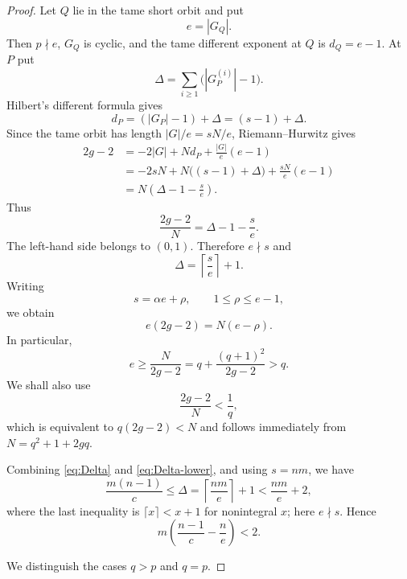 \documentclass[11pt]{amsart}
\theoremstyle{remark}
\begin{document}
\begin{proof}
Let $Q$ lie in the tame short orbit and put
\[
          e=|G_Q|.
\]
Then $p\nmid e$, $G_Q$ is cyclic, and the tame different exponent at
$Q$ is $d_Q=e-1$.  At $P$ put
\[
          \Delta=\sum_{i\ge1}\bigl(|G_P^{(i)}|-1\bigr).
\]
Hilbert's different formula gives
\[
          d_P=(|G_P|-1)+\Delta=(s-1)+\Delta.
\]
Since the tame orbit has length $|G|/e=sN/e$, Riemann--Hurwitz gives
\[
\begin{aligned}
 2g-2
   &=-2|G|+N d_P+\frac{|G|}{e}(e-1)\\
   &=-2sN+N\bigl((s-1)+\Delta\bigr)
      +\frac{sN}{e}(e-1)\\
   &=N\left(\Delta-1-\frac{s}{e}\right).
\end{aligned}
\]
Thus
\begin{equation}\label{eq:globalRH}
 \frac{2g-2}{N}
 =
 \Delta-1-\frac{s}{e}.
\end{equation}
The left-hand side belongs to $(0,1)$.  Therefore $e\nmid s$ and
\begin{equation}\label{eq:Delta}
          \Delta=\left\lceil\frac{s}{e}\right\rceil+1.
\end{equation}
Writing
\[
          s=\alpha e+\rho,
          \qquad 1\le\rho\le e-1,
\]
we obtain
\[
          e(2g-2)=N(e-\rho).
\]
In particular,
\begin{equation}\label{eq:e-lower}
          e\ge\frac{N}{2g-2}
          =q+\frac{(q+1)^2}{2g-2}>q.
\end{equation}
We shall also use
\begin{equation}\label{eq:ratio-less-1q}
          \frac{2g-2}{N}<\frac1q,
\end{equation}
which is equivalent to $q(2g-2)<N$ and follows immediately from
$N=q^2+1+2gq$.

Combining \eqref{eq:Delta} and \eqref{eq:Delta-lower}, and using
$s=nm$, we have
\[
 \frac{m(n-1)}{c}
 \le \Delta
 =\left\lceil\frac{nm}{e}\right\rceil+1
 <\frac{nm}{e}+2,
\]
where the last inequality is $\lceil x\rceil<x+1$ for nonintegral
$x$; here $e\nmid s$.  Hence
\begin{equation}\label{eq:master}
 m\left(\frac{n-1}{c}-\frac{n}{e}\right)<2.
\end{equation}

We distinguish the cases $q>p$ and $q=p$.


\end{proof}
\end{document}
